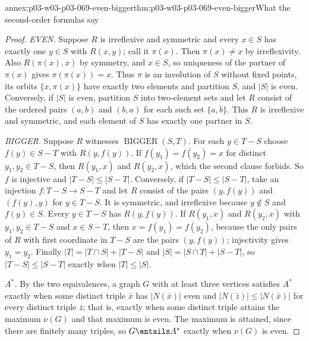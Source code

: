 \begin{annexitem}{annex:p03-w03-p03-069-even-bigger}{thm:p03-w03-p03-069-even-bigger}{What the second-order formulas say}
\begin{proof}
\emph{EVEN.}  Suppose \(R\) is irreflexive and symmetric and every \(x\in S\)
has exactly one \(y\in S\) with \(R(x,y)\); call it \(\pi(x)\).  Then
\(\pi(x)\neq x\) by irreflexivity.  Also \(R(\pi(x),x)\) by symmetry, and
\(x\in S\), so uniqueness of the partner of \(\pi(x)\) gives
\(\pi(\pi(x))=x\).  Thus \(\pi\) is an involution of \(S\) without fixed
points, its orbits \(\{x,\pi(x)\}\) have exactly two elements and partition
\(S\), and \(|S|\) is even.  Conversely, if \(|S|\) is even, partition \(S\)
into two-element sets and let \(R\) consist of the ordered pairs \((a,b)\) and
\((b,a)\) for each such set \(\{a,b\}\).  This \(R\) is irreflexive and
symmetric, and each element of \(S\) has exactly one partner in \(S\).

\emph{BIGGER.}  Suppose \(R\) witnesses \(\operatorname{BIGGER}(S,T)\).  For
each \(y\in T-S\) choose \(f(y)\in S-T\) with \(R(y,f(y))\).  If
\(f(y_1)=f(y_2)=x\) for distinct \(y_1,y_2\in T-S\), then \(R(y_1,x)\) and
\(R(y_2,x)\), which the second clause forbids.  So \(f\) is injective and
\(|T-S|\leq|S-T|\).  Conversely, if \(|T-S|\leq|S-T|\), take an injection
\(f\colon T-S\to S-T\) and let \(R\) consist of the pairs \((y,f(y))\) and
\((f(y),y)\) for \(y\in T-S\).  It is symmetric, and irreflexive because
\(y\notin S\) and \(f(y)\in S\).  Every \(y\in T-S\) has \(R(y,f(y))\).  If
\(R(y_1,x)\) and \(R(y_2,x)\) with \(y_1,y_2\in T-S\) and \(x\in S-T\), then
\(x=f(y_1)=f(y_2)\), because the only pairs of \(R\) with first coordinate in
\(T-S\) are the pairs \((y,f(y))\); injectivity gives \(y_1=y_2\).  Finally
\(|T|=|T\cap S|+|T-S|\) and \(|S|=|S\cap T|+|S-T|\), so
\(|T-S|\leq|S-T|\) exactly when \(|T|\leq|S|\).

\emph{\(A^*\).}  By the two equivalences, a graph \(G\) with at least three
vertices satisfies \(A^*\) exactly when some distinct triple \(\bar x\) has
\(|N(\bar x)|\) even and \(|N(\bar z)|\leq|N(\bar x)|\) for every distinct
triple \(\bar z\); that is, exactly when some distinct triple attains the
maximum \(\nu(G)\) and that maximum is even.  The maximum is attained, since
there are finitely many triples, so \(G\entails A^*\) exactly when \(\nu(G)\)
is even.
\end{proof}
\end{annexitem}

